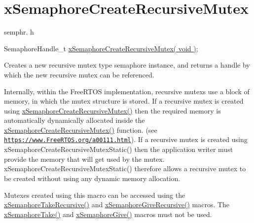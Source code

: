 \hypertarget{group__x_semaphore_create_recursive_mutex}{}\section{x\+Semaphore\+Create\+Recursive\+Mutex}
\label{group__x_semaphore_create_recursive_mutex}
semphr. h 
\begin{DoxyPre}
SemaphoreHandle\_t \hyperlink{vendor_2ceedling_2plugins_2freertos_2src_2freertos_2include_2semphr_8h_a1bbc843be5a41ea83d2693b2189fc0f8}{xSemaphoreCreateRecursiveMutex( void )};
\end{DoxyPre}


Creates a new recursive mutex type semaphore instance, and returns a handle by which the new recursive mutex can be referenced.

Internally, within the Free\+R\+T\+OS implementation, recursive mutexs use a block of memory, in which the mutex structure is stored. If a recursive mutex is created using \hyperlink{vendor_2ceedling_2plugins_2freertos_2src_2freertos_2include_2semphr_8h_a1bbc843be5a41ea83d2693b2189fc0f8}{x\+Semaphore\+Create\+Recursive\+Mutex()} then the required memory is automatically dynamically allocated inside the \hyperlink{vendor_2ceedling_2plugins_2freertos_2src_2freertos_2include_2semphr_8h_a1bbc843be5a41ea83d2693b2189fc0f8}{x\+Semaphore\+Create\+Recursive\+Mutex()} function. (see \href{https://www.FreeRTOS.org/a00111.html}{\tt https\+://www.\+Free\+R\+T\+O\+S.\+org/a00111.\+html}). If a recursive mutex is created using x\+Semaphore\+Create\+Recursive\+Mutex\+Static() then the application writer must provide the memory that will get used by the mutex. x\+Semaphore\+Create\+Recursive\+Mutex\+Static() therefore allows a recursive mutex to be created without using any dynamic memory allocation.

Mutexes created using this macro can be accessed using the \hyperlink{vendor_2ceedling_2plugins_2freertos_2src_2freertos_2include_2semphr_8h_ad395f4bba51eea6af3397d72bc079e4d}{x\+Semaphore\+Take\+Recursive()} and \hyperlink{vendor_2ceedling_2plugins_2freertos_2src_2freertos_2include_2semphr_8h_a398d66b17856c22dd49d39aaac42f105}{x\+Semaphore\+Give\+Recursive()} macros. The \hyperlink{externals_2freertos_2include_2semphr_8h_af116e436d2a5ae5bd72dbade2b5ea930}{x\+Semaphore\+Take()} and \hyperlink{externals_2freertos_2include_2semphr_8h_aae55761cabfa9bf85c8f4430f78c0953}{x\+Semaphore\+Give()} macros must not be used.


